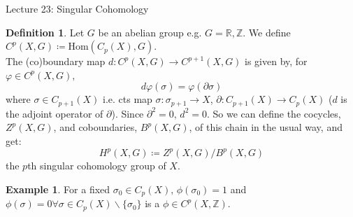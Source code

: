 \documentclass[10pt]{article}
\theoremstyle{plain}
\theoremstyle{definition}
\newtheorem{defn}[thm]{Definition} %
\newtheorem{exmp}[thm]{Example} %
\newcommand{\Real}{\mathbb{R}}
\newcommand{\Hom}[2]{\text{Hom}\left(#1,#2\right)}
\newcommand{\deriv}{d}
\begin{document}
\begin{section}{Lecture 23: Singular Cohomology}

\begin{defn}
Let $G$ be an abelian group e.g. $G = \Real, \mathbb{Z}$. We define $C^p(X,G) \coloneqq \Hom{C_p(X)}{G}$. \\
The (co)boundary map $d:C^p(X,G) \to C^{p+1}(X,G)$ is given by, for $\varphi\in C^p(X,G), $ $$\deriv \varphi(\sigma) = \varphi(\partial \sigma)$$ where $\sigma\in C_{p+1}(X)$ i.e. cts map $\sigma:\sigma_{p+1} \to X$, $\partial : C_{p+1}(X) \to C_p(X)$ ($\deriv$ is the adjoint operator of $\partial$). Since $\partial^2 = 0, \, \deriv ^2 = 0$. So we can define the cocycles, $Z^p(X,G)$, and coboundaries, $B^p(X,G)$, of this chain in the usual way, and get:
$$H^p(X,G) \coloneqq Z^p(X,G) / B^p(X,G)$$
the $p$th singular cohomology group of $X$.
\end{defn}

\begin{exmp}
    For a fixed $\sigma_0 \in C_p(X),\,\phi(\sigma_0) = 1 $ and $\phi(\sigma)=0 \forall \sigma\in C_p(X)\backslash\{\sigma_0\}$ is a $\phi \in C^p(X,\mathbb{Z})$.
\end{exmp}


\end{section}
\end{document}
